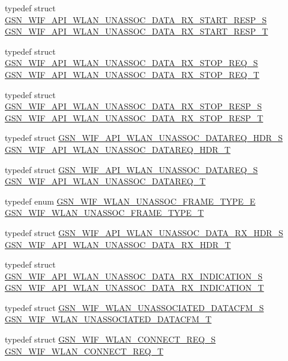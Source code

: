 \begin{DoxyCompactItemize}
\item 
typedef struct \hyperlink{a00311}{GSN\_\-WIF\_\-API\_\-WLAN\_\-UNASSOC\_\-DATA\_\-RX\_\-START\_\-RESP\_\-S} \hyperlink{a00677_ga95accf920268c313a0e4f7f3e2c1badb}{GSN\_\-WIF\_\-API\_\-WLAN\_\-UNASSOC\_\-DATA\_\-RX\_\-START\_\-RESP\_\-T}
\item 
typedef struct \hyperlink{a00312}{GSN\_\-WIF\_\-API\_\-WLAN\_\-UNASSOC\_\-DATA\_\-RX\_\-STOP\_\-REQ\_\-S} \hyperlink{a00677_gac5ede6da67a0712caac09230fabc842d}{GSN\_\-WIF\_\-API\_\-WLAN\_\-UNASSOC\_\-DATA\_\-RX\_\-STOP\_\-REQ\_\-T}
\item 
typedef struct \hyperlink{a00313}{GSN\_\-WIF\_\-API\_\-WLAN\_\-UNASSOC\_\-DATA\_\-RX\_\-STOP\_\-RESP\_\-S} \hyperlink{a00677_gafa5e88ed5ebe7b8fd34b54650cd38b14}{GSN\_\-WIF\_\-API\_\-WLAN\_\-UNASSOC\_\-DATA\_\-RX\_\-STOP\_\-RESP\_\-T}
\item 
typedef struct \hyperlink{a00314}{GSN\_\-WIF\_\-API\_\-WLAN\_\-UNASSOC\_\-DATAREQ\_\-HDR\_\-S} \hyperlink{a00677_gad488d4cf717d350b9dc7944e43dde197}{GSN\_\-WIF\_\-API\_\-WLAN\_\-UNASSOC\_\-DATAREQ\_\-HDR\_\-T}
\item 
typedef struct \hyperlink{a00315}{GSN\_\-WIF\_\-API\_\-WLAN\_\-UNASSOC\_\-DATAREQ\_\-S} \hyperlink{a00677_gaba0b2d84a922f905d634921a7b54965f}{GSN\_\-WIF\_\-API\_\-WLAN\_\-UNASSOC\_\-DATAREQ\_\-T}
\item 
typedef enum \hyperlink{a00677_ga1b471d184450287e7d0cec7c8d0c4639}{GSN\_\-WIF\_\-WLAN\_\-UNASSOC\_\-FRAME\_\-TYPE\_\-E} \hyperlink{a00677_gad59650e43344fc48d5ecf8cd2f018110}{GSN\_\-WIF\_\-WLAN\_\-UNASSOC\_\-FRAME\_\-TYPE\_\-T}
\item 
typedef struct \hyperlink{a00308}{GSN\_\-WIF\_\-API\_\-WLAN\_\-UNASSOC\_\-DATA\_\-RX\_\-HDR\_\-S} \hyperlink{a00677_ga57b43efb2b44092ec2875db7226c2cc4}{GSN\_\-WIF\_\-API\_\-WLAN\_\-UNASSOC\_\-DATA\_\-RX\_\-HDR\_\-T}
\item 
typedef struct \hyperlink{a00309}{GSN\_\-WIF\_\-API\_\-WLAN\_\-UNASSOC\_\-DATA\_\-RX\_\-INDICATION\_\-S} \hyperlink{a00677_gab8d04ec915313a8e011ff5a106bae33e}{GSN\_\-WIF\_\-API\_\-WLAN\_\-UNASSOC\_\-DATA\_\-RX\_\-INDICATION\_\-T}
\item 
typedef struct \hyperlink{a00414}{GSN\_\-WIF\_\-WLAN\_\-UNASSOCIATED\_\-DATACFM\_\-S} \hyperlink{a00677_gabaad9b9d5e1ea42d58c557ee71b1469b}{GSN\_\-WIF\_\-WLAN\_\-UNASSOCIATED\_\-DATACFM\_\-T}
\item 
typedef struct \hyperlink{a00374}{GSN\_\-WIF\_\-WLAN\_\-CONNECT\_\-REQ\_\-S} \hyperlink{a00677_ga017431808d3e402931e4b6bfd133240b}{GSN\_\-WIF\_\-WLAN\_\-CONNECT\_\-REQ\_\-T}

\end{DoxyCompactItemize}
